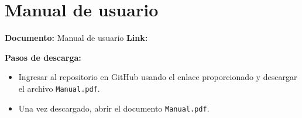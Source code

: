 \section{Manual de usuario}

\textbf{Documento:} Manual de usuario
\newline
\textbf{Link: \linkManualUsuario} 

\textbf{Pasos de descarga:}
\begin{itemize}
    \item Ingresar al repositorio en GitHub usando el enlace proporcionado y descargar el archivo \texttt{Manual.pdf}.
    \item Una vez descargado, abrir el documento \texttt{Manual.pdf}.
\end{itemize}